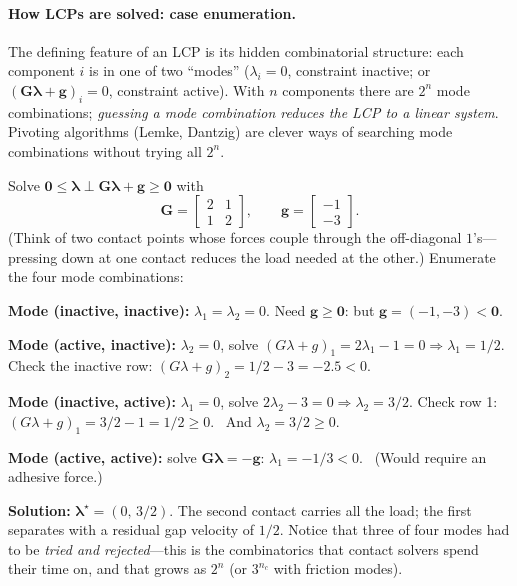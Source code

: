 \documentclass[11pt,twoside]{report}
\theoremstyle{definition}
\theoremstyle{plain}
\theoremstyle{remark}
\newcommand{\0}{\bm{0}}
\begin{document}
\paragraph{How LCPs are solved: case enumeration.}
The defining feature of an LCP is its hidden combinatorial structure:
each component $i$ is in one of two ``modes''
($\lambda_{i}=0$, constraint inactive; or $(\bm{G}\bm{\lambda}+\bm{g})_{i}=0$,
constraint active). With $n$ components there are $2^{n}$ mode
combinations; \emph{guessing a mode combination reduces the LCP to a
linear system}. Pivoting algorithms (Lemke, Dantzig) are clever ways of
searching mode combinations without trying all $2^{n}$.

\begin{examplebox}
Solve $\0\le\bm{\lambda}\perp\bm{G}\bm{\lambda}+\bm{g}\ge\0$ with
\begin{equation*}
\bm{G}=\begin{bmatrix}2&1\\1&2\end{bmatrix},\qquad
\bm{g}=\begin{bmatrix}-1\\-3\end{bmatrix}.
\end{equation*}
(Think of two contact points whose forces couple through the
off-diagonal $1$'s---pressing down at one contact reduces the load
needed at the other.) Enumerate the four mode combinations:

\textbf{Mode (inactive, inactive):} $\lambda_{1}=\lambda_{2}=0$.
Need $\bm{g}\ge\0$: but $\bm{g}=(-1,-3)<\0$. \texttimes

\textbf{Mode (active, inactive):} $\lambda_{2}=0$, solve
$(G\lambda+g)_{1}=2\lambda_{1}-1=0\Rightarrow\lambda_{1}=1/2$.
Check the inactive row: $(G\lambda+g)_{2}=1/2-3=-2.5<0$. \texttimes

\textbf{Mode (inactive, active):} $\lambda_{1}=0$, solve
$2\lambda_{2}-3=0\Rightarrow\lambda_{2}=3/2$.
Check row 1: $(G\lambda+g)_{1}=3/2-1=1/2\ge 0$. \checkmark\
And $\lambda_{2}=3/2\ge 0$. \checkmark

\textbf{Mode (active, active):} solve
$\bm{G}\bm{\lambda}=-\bm{g}$:
$\lambda_{1}=-1/3<0$. \texttimes\ (Would require an adhesive force.)

\textbf{Solution:} $\bm{\lambda}^{\star}=(0,\,3/2)$. The second contact
carries all the load; the first separates with a residual gap velocity
of $1/2$. Notice that three of four modes had to be \emph{tried and
rejected}---this is the combinatorics that contact solvers spend their
time on, and that grows as $2^{n}$ (or $3^{n_c}$ with friction modes).
\end{examplebox}
\end{document}
